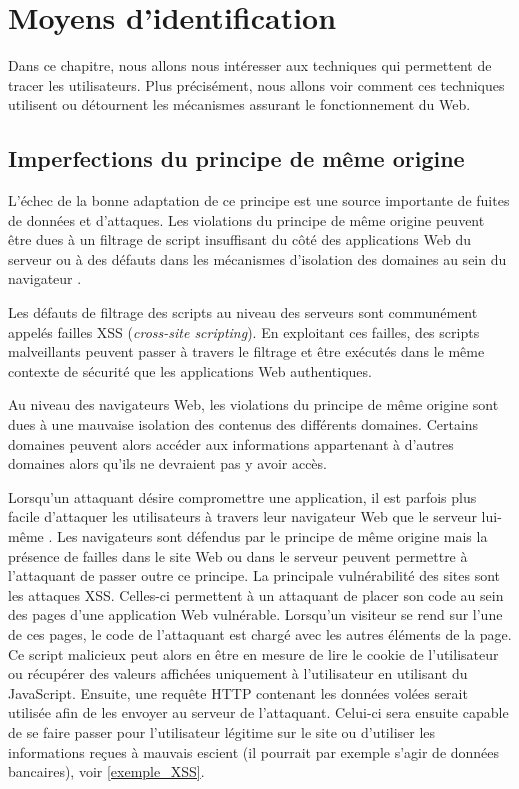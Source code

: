 \chapter{Moyens d'identification}
Dans ce chapitre, nous allons nous intéresser aux techniques qui permettent de tracer les utilisateurs. Plus précisément, nous allons voir comment ces techniques utilisent ou détournent les mécanismes assurant le fonctionnement du Web.

\section{Imperfections du principe de même origine}
\label{imperfections_sop}
L'échec de la bonne adaptation de ce principe est une source importante de fuites de données et d'attaques. Les violations du principe de même origine peuvent être dues à un filtrage de script insuffisant du côté des applications Web du serveur ou à des défauts dans les mécanismes d'isolation des domaines au sein du navigateur \cite{Chen:2007:ABD:1315245.1315248}.

Les défauts de filtrage des scripts au niveau des serveurs sont communément appelés failles XSS (\textit{cross-site scripting}). En exploitant ces failles, des scripts malveillants peuvent passer à travers le filtrage et être exécutés dans le même contexte de sécurité que les applications Web authentiques.

Au niveau des navigateurs Web, les violations du principe de même origine sont dues à une mauvaise isolation des contenus des différents domaines. Certains domaines peuvent alors accéder aux informations appartenant à d'autres domaines alors qu'ils ne devraient pas y avoir accès.
\newline

Lorsqu'un attaquant désire compromettre une application, il est parfois plus facile d'attaquer les utilisateurs à travers leur navigateur Web que le serveur lui-même \cite{sullivan2011web}. Les navigateurs sont défendus par le principe de même origine mais la présence de failles dans le site Web ou dans le serveur peuvent permettre à l'attaquant de passer outre ce principe. La principale vulnérabilité des sites sont les attaques XSS. Celles-ci permettent à un attaquant de placer son code au sein des pages d'une application Web vulnérable. Lorsqu'un visiteur se rend sur l'une de ces pages, le code de l'attaquant est chargé avec les autres éléments de la page. Ce script malicieux peut alors en être en mesure de lire le cookie de l'utilisateur ou récupérer des valeurs affichées uniquement à l'utilisateur en utilisant du JavaScript. Ensuite, une requête HTTP contenant les données volées serait utilisée afin de les envoyer au serveur de l'attaquant. Celui-ci sera ensuite capable de se faire passer pour l'utilisateur légitime sur le site ou d'utiliser les informations reçues à mauvais escient (il pourrait par exemple s'agir de données bancaires), voir \autoref{exemple_XSS}.
\newline

